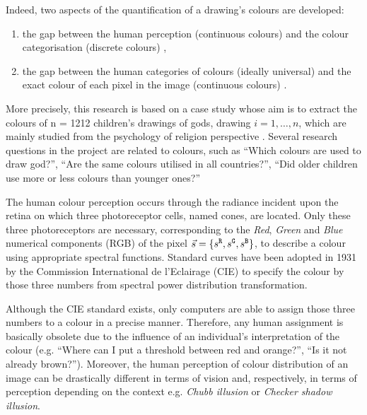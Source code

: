 \documentclass[11pt,a4paper]{article}
\begin{document}
Indeed, two aspects of the quantification of a drawing's colours are
developed:

\begin{enumerate}
\item
  the gap between the human perception (continuous colours) and the
  colour categorisation (discrete colours)
  \cite[see e.g.][]{parragaakbarinia2016, benavente2008, berlinkay1969},
\item
  the gap between the human categories of colours (ideally universal)
  and the exact colour of each pixel in the image (continuous colours)
  \cite{khan2012, khan2013}.
\end{enumerate}

More precisely, this research is based on a case study whose aim is to
extract the colours of n = 1212 children's drawings of gods, drawing
\(i = 1, \dots, n\), which are mainly studied from the psychology of
religion perspective \cite[see][]{ddds}. Several research questions in
the project are related to colours, such as ``Which colours are used to
draw god?'', ``Are the same colours utilised in all countries?'', ``Did
older children use more or less colours than younger ones?''


The human colour perception occurs through the radiance incident upon
the retina on which three photoreceptor cells, named cones, are located.
Only these three photoreceptors are necessary, corresponding to the
\emph{Red}, \emph{Green} and \emph{Blue} numerical components (RGB) of
the pixel
\(\vec{s} = \{ s^{\tt \scriptstyle R}, s^{\tt \scriptstyle G}, s^{\tt \scriptstyle B} \}\),
to describe a colour using appropriate spectral functions. Standard
curves have been adopted in 1931 by the Commission International de
l'Eclairage (CIE) to specify the colour by those three numbers from
spectral power distribution transformation.

Although the CIE standard exists, only computers are able to assign
those three numbers to a colour in a precise manner. Therefore, any
human assignment is basically obsolete due to the influence of an
individual's interpretation of the colour (e.g. ``Where can I put a
threshold between red and orange?'', ``Is it not already brown?'').
Moreover, the human perception of colour distribution of an image can be
drastically different in terms of vision \cite{jobson1997} and,
respectively, in terms of perception depending on the context e.g.
\emph{Chubb illusion} or \emph{Checker shadow illusion}.
\end{document}
